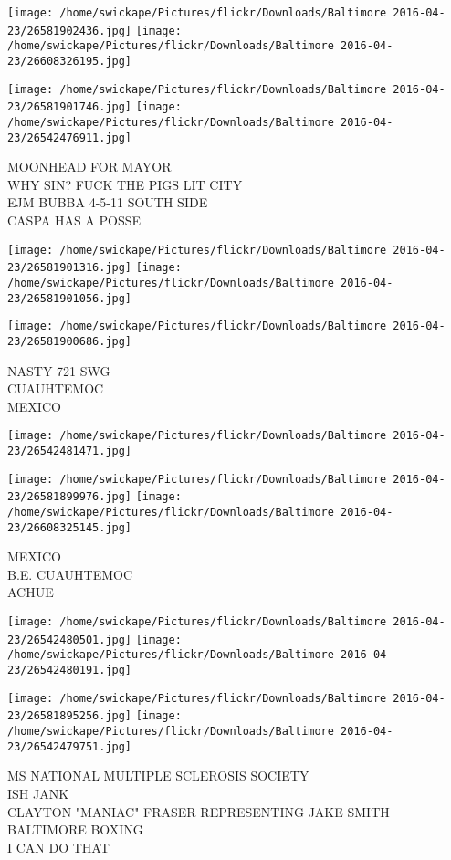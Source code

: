 \documentclass[10pt,letterpaper]{article}
\begin{document}
\texttt{[image: /home/swickape/Pictures/flickr/Downloads/Baltimore 2016-04-23/26581902436.jpg]}
\texttt{[image: /home/swickape/Pictures/flickr/Downloads/Baltimore 2016-04-23/26608326195.jpg]}

\texttt{[image: /home/swickape/Pictures/flickr/Downloads/Baltimore 2016-04-23/26581901746.jpg]}
\texttt{[image: /home/swickape/Pictures/flickr/Downloads/Baltimore 2016-04-23/26542476911.jpg]}

MOONHEAD FOR MAYOR\\
WHY SIN?  FUCK THE PIGS LIT CITY\\
EJM BUBBA 4{-}5{-}11 SOUTH SIDE\\
CASPA HAS A POSSE
\pagebreak

\texttt{[image: /home/swickape/Pictures/flickr/Downloads/Baltimore 2016-04-23/26581901316.jpg]}
\texttt{[image: /home/swickape/Pictures/flickr/Downloads/Baltimore 2016-04-23/26581901056.jpg]}

\texttt{[image: /home/swickape/Pictures/flickr/Downloads/Baltimore 2016-04-23/26581900686.jpg]}

NASTY 721 SWG\\
CUAUHTEMOC\\
MEXICO
\pagebreak

\texttt{[image: /home/swickape/Pictures/flickr/Downloads/Baltimore 2016-04-23/26542481471.jpg]}

\vspace{0.25in}
\texttt{[image: /home/swickape/Pictures/flickr/Downloads/Baltimore 2016-04-23/26581899976.jpg]}
\texttt{[image: /home/swickape/Pictures/flickr/Downloads/Baltimore 2016-04-23/26608325145.jpg]}

MEXICO\\
B.E. CUAUHTEMOC\\
ACHUE
\pagebreak

\texttt{[image: /home/swickape/Pictures/flickr/Downloads/Baltimore 2016-04-23/26542480501.jpg]}
\texttt{[image: /home/swickape/Pictures/flickr/Downloads/Baltimore 2016-04-23/26542480191.jpg]}

\texttt{[image: /home/swickape/Pictures/flickr/Downloads/Baltimore 2016-04-23/26581895256.jpg]}
\texttt{[image: /home/swickape/Pictures/flickr/Downloads/Baltimore 2016-04-23/26542479751.jpg]}

MS NATIONAL MULTIPLE SCLEROSIS SOCIETY\\
ISH JANK\\
CLAYTON "MANIAC" FRASER REPRESENTING JAKE SMITH BALTIMORE BOXING\\
I CAN DO THAT
\pagebreak
\end{document}
